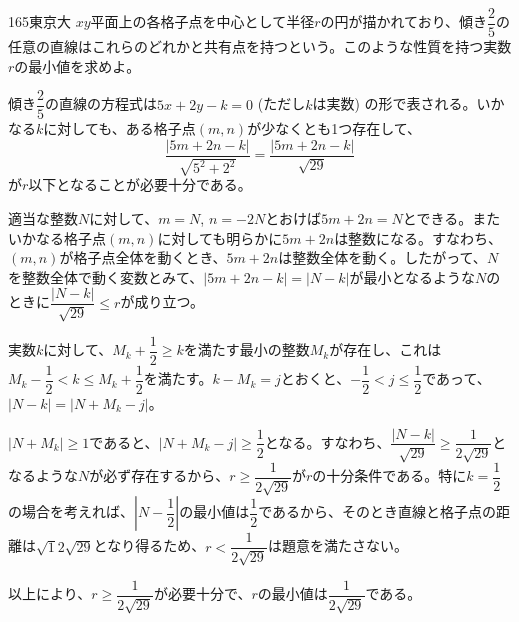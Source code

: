\begin{thm}{165}{\maru}{東京大}
 $xy$平面上の各格子点を中心として半径$r$の円が描かれており、傾き$\dfrac{2}{5}$の任意の直線はこれらのどれかと共有点を持つという。このような性質を持つ実数$r$の最小値を求めよ。
\end{thm}

傾き$\dfrac{2}{5}$の直線の方程式は$5x+2y-k=0$ (ただし$k$は実数) の形で表される。いかなる$k$に対しても、ある格子点$(m, n)$が少なくとも1つ存在して、
\[ \frac{|5m+2n-k|}{\sqrt{5^2+2^2}}=\frac{|5m+2n-k|}{\sqrt{29}} \]
が$r$以下となることが必要十分である。

適当な整数$N$に対して、$m=N$, $n=-2N$とおけば$5m+2n=N$とできる。またいかなる格子点$(m, n)$に対しても明らかに$5m+2n$は整数になる。すなわち、$(m, n)$が格子点全体を動くとき、$5m+2n$は整数全体を動く。したがって、$N$を整数全体で動く変数とみて、$|5m+2n-k|=|N-k|$が最小となるような$N$のときに$\dfrac{|N-k|}{\sqrt{29}}\le r$が成り立つ。

実数$k$に対して、$M_k+\dfrac{1}{2}\ge k$を満たす最小の整数$M_k$が存在し、これは$M_k-\dfrac{1}{2}<k\le M_k+\dfrac{1}{2}$を満たす。$k-M_k=j$とおくと、$-\dfrac{1}{2}<j\le\dfrac{1}{2}$であって、$|N-k|=|N+M_k-j|$。

$|N+M_k|\ge 1$であると、$|N+M_k-j|\ge\dfrac{1}{2}$となる。すなわち、$\dfrac{|N-k|}{\sqrt{29}}\ge\dfrac{1}{2\sqrt{29}}$となるような$N$が必ず存在するから、$r\ge\dfrac{1}{2\sqrt{29}}$が$r$の十分条件である。特に$k=\dfrac{1}{2}$の場合を考えれば、$\left|N-\dfrac{1}{2}\right|$の最小値は$\dfrac{1}{2}$であるから、そのとき直線と格子点の距離は$\sqrt{1}{2\sqrt{29}}$となり得るため、$r<\dfrac{1}{2\sqrt{29}}$は題意を満たさない。

以上により、$r\ge\dfrac{1}{2\sqrt{29}}$が必要十分で、$r$の最小値は$\dfrac{1}{2\sqrt{29}}$である。